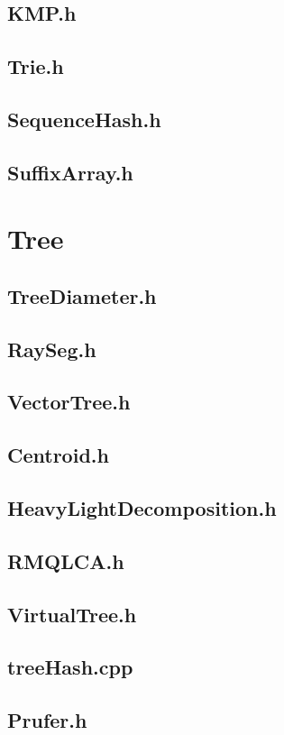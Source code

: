 \subsection{KMP.h}

\subsection{Trie.h}

\subsection{SequenceHash.h}

\subsection{SuffixArray.h}

\section{Tree}
\subsection{TreeDiameter.h}

\subsection{RaySeg.h}

\subsection{VectorTree.h}

\subsection{Centroid.h}

\subsection{HeavyLightDecomposition.h}

\subsection{RMQLCA.h}

\subsection{VirtualTree.h}

\subsection{treeHash.cpp}

\subsection{Prufer.h}

